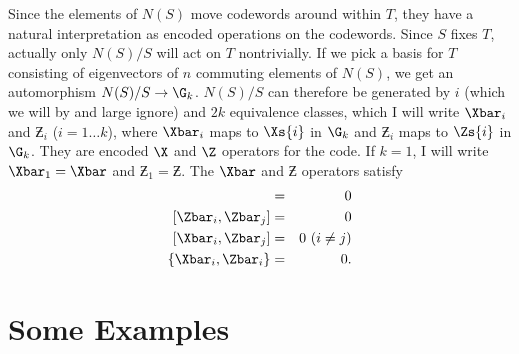 Since the elements of $N(S)$ move codewords around within $T$, they
have a natural interpretation as encoded operations on the codewords.
Since $S$ fixes $T$, actually only $N(S) / S$ will act on $T$ nontrivially.  If
we pick a basis for $T$ consisting of eigenvectors of $n$ commuting elements
of $N(S)$, we get an automorphism $N(S) / S \rightarrow \G_k$.  $N(S)/S$ can
therefore be generated by $i$ (which we will by and large ignore) and $2k$
equivalence classes, which I will write $\Xbar_i$ and $\Zbar_i$ ($i=1
\ldots k$), where $\Xbar_i$ maps to $\Xs{i}$ in $\G_k$ and $\Zbar_i$
maps to $\Zs{i}$ in $\G_k$.  They are encoded $\X$ and $\Z$ operators for
the code.  If $k=1$, I will write $\Xbar_1 = \Xbar$ and $\Zbar_1 = \Zbar$.
The $\Xbar$ and $\Zbar$ operators satisfy
\begin{eqnarray}
[\Xbar_i, \Xbar_j] & = & 0 \\
{[}\Zbar_i, \Zbar_j] & = & 0 \\
{[}\Xbar_i, \Zbar_j] & = & 0\ (i \neq j) \\
\{\Xbar_i, \Zbar_i \} & = & 0.
\end{eqnarray}

\section{Some Examples}
\label{sec-stab-examples}

